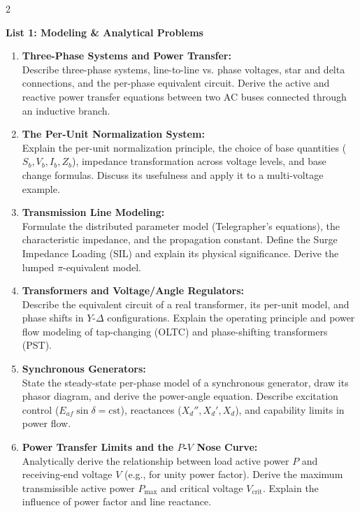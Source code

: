 \documentclass[a4paper,10pt]{article}
\begin{document}
\begin{multicols}{2}

\textbf{\large List 1: Modeling \& Analytical Problems}
\vspace{0.2em}
\begin{enumerate}[leftmargin=*, itemsep=0.35em, topsep=0.2em]
    \item \textbf{Three-Phase Systems and Power Transfer:}\\
    Describe three-phase systems, line-to-line vs. phase voltages, star and delta connections, and the per-phase equivalent circuit. Derive the active and reactive power transfer equations between two AC buses connected through an inductive branch.
    
    \item \textbf{The Per-Unit Normalization System:}\\
    Explain the per-unit normalization principle, the choice of base quantities ($S_b, V_b, I_b, Z_b$), impedance transformation across voltage levels, and base change formulas. Discuss its usefulness and apply it to a multi-voltage example.
    
    \item \textbf{Transmission Line Modeling:}\\
    Formulate the distributed parameter model (Telegrapher's equations), the characteristic impedance, and the propagation constant. Define the Surge Impedance Loading (SIL) and explain its physical significance. Derive the lumped $\pi$-equivalent model.
    
    \item \textbf{Transformers and Voltage/Angle Regulators:}\\
    Describe the equivalent circuit of a real transformer, its per-unit model, and phase shifts in $Y$-$\Delta$ configurations. Explain the operating principle and power flow modeling of tap-changing (OLTC) and phase-shifting transformers (PST).
    
    \item \textbf{Synchronous Generators:}\\
    State the steady-state per-phase model of a synchronous generator, draw its phasor diagram, and derive the power-angle equation. Describe excitation control ($E_{af}\sin\delta = \text{cst}$), reactances ($X_d'', X_d', X_d$), and capability limits in power flow.
    
    \item \textbf{Power Transfer Limits and the $P$-$V$ Nose Curve:}\\
    Analytically derive the relationship between load active power $P$ and receiving-end voltage $V$ (e.g., for unity power factor). Derive the maximum transmissible active power $P_{\max}$ and critical voltage $V_{\text{crit}}$. Explain the influence of power factor and line reactance.
\end{enumerate}


\end{multicols}
\end{document}
